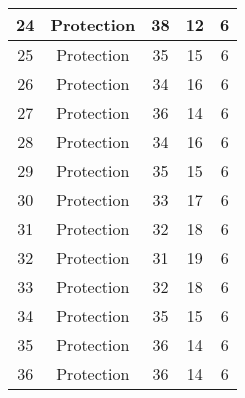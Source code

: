 \documentclass[results.tex]{subfiles}
\begin{document}
\begin{center}
\begin{tabular}{| c || c | c | c | c |}
            \hline
            24                      & Protection                   & 38                     & 12                      & 6                    \\
            \hline
            25                      & Protection                   & 35                     & 15                      & 6                    \\
            \hline
            26                      & Protection                   & 34                     & 16                      & 6                    \\
            \hline
            27                      & Protection                   & 36                     & 14                      & 6                    \\
            \hline
            28                      & Protection                   & 34                     & 16                      & 6                    \\
            \hline
            29                      & Protection                   & 35                     & 15                      & 6                    \\
            \hline
            30                      & Protection                   & 33                     & 17                      & 6                    \\
            \hline
            31                      & Protection                   & 32                     & 18                      & 6                    \\
            \hline
            32                      & Protection                   & 31                     & 19                      & 6                    \\
            \hline
            33                      & Protection                   & 32                     & 18                      & 6                    \\
            \hline
            34                      & Protection                   & 35                     & 15                      & 6                    \\
            \hline
            35                      & Protection                   & 36                     & 14                      & 6                    \\
            \hline
            36                      & Protection                   & 36                     & 14                      & 6                    \\

\end{tabular}
\end{center}
\end{document}
